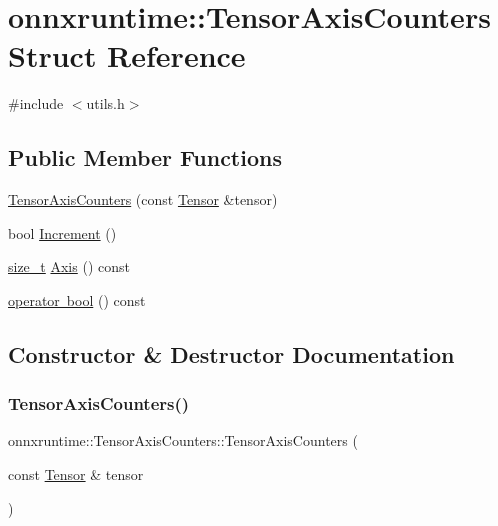 \hypertarget{structonnxruntime_1_1TensorAxisCounters}{}\section{onnxruntime\+:\+:Tensor\+Axis\+Counters Struct Reference}
\label{structonnxruntime_1_1TensorAxisCounters}


{\ttfamily \#include $<$utils.\+h$>$}

\subsection*{Public Member Functions}
\begin{DoxyCompactItemize}
\item 
\mbox{\hyperlink{structonnxruntime_1_1TensorAxisCounters_a6b6a9aa0eebd822034f70fc0766bd6a8}{Tensor\+Axis\+Counters}} (const \mbox{\hyperlink{classonnxruntime_1_1Tensor}{Tensor}} \&tensor)
\item 
bool \mbox{\hyperlink{structonnxruntime_1_1TensorAxisCounters_a415b830362fe2b8b3785aac919d5c3c9}{Increment}} ()
\item 
\mbox{\hyperlink{mlasi_8h_a503efbc1c6e50825320ad909366b78ab}{size\+\_\+t}} \mbox{\hyperlink{structonnxruntime_1_1TensorAxisCounters_a390b4fc504ddc306dc57ebf2da31dc43}{Axis}} () const
\item 
\mbox{\hyperlink{structonnxruntime_1_1TensorAxisCounters_adcb26612a8a724933ec3103cf599c6f7}{operator bool}} () const
\end{DoxyCompactItemize}


\subsection{Constructor \& Destructor Documentation}
\mbox{\label{structonnxruntime_1_1TensorAxisCounters_a6b6a9aa0eebd822034f70fc0766bd6a8}} 
\subsubsection{\texorpdfstring{Tensor\+Axis\+Counters()}{TensorAxisCounters()}}
{\footnotesize\ttfamily onnxruntime\+::\+Tensor\+Axis\+Counters\+::\+Tensor\+Axis\+Counters (\begin{DoxyParamCaption}\item[{const \mbox{\hyperlink{classonnxruntime_1_1Tensor}{Tensor}} \&}]{tensor }\end{DoxyParamCaption})\hspace{0.3cm}{\ttfamily [inline]}}



